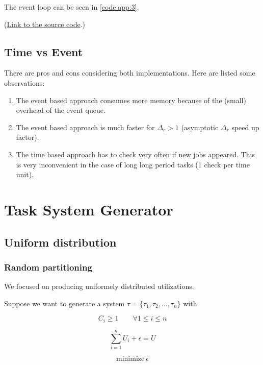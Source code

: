 \documentclass[a4paper,12pt]{article}
\begin{document}
The event loop can be seen in \ref{code:app:3}.


(\href{../h/os/llf_scheduler_event_based.h}{Link to the source code}.)
\subsection{Time vs Event}

There are pros and cons considering both implementations. Here are listed some observations:

\begin{enumerate}
	\item The event based approach consumes more memory because of the (small) overhead of the event queue.
	\item The event based approach is much faster for $\Delta_r > 1$ (asymptotic $\Delta_r$ speed up factor).
	\item The time based approach has to check very often if new jobs appeared. This is very inconvenient in the case of long long period tasks (1 check per time unit).
\end{enumerate}

\newpage\cleardoublepage{}
\section{Task System Generator}
\label{sec:gen}
\subsection{Uniform distribution}

\subsubsection{Random partitioning}

We focused on producing uniformely distributed utilizations.

Suppose we want to generate a system $\tau = \{\tau_1 , \tau_2 , \dots , \tau_n \}$ with

\begin{equation}
	C_i \geq 1 \qquad \forall 1 \leq i \leq n
	\label{eq:WCET minimum}
\end{equation}

\begin{equation}
	\sum_{i=1}^{n} U_i + \epsilon = U
	\label{eq:Usage shift}
\end{equation}

\begin{equation}
	\text{minimize}~\epsilon
	\label{eq:Economic function of the generator}
\end{equation}
\end{document}
